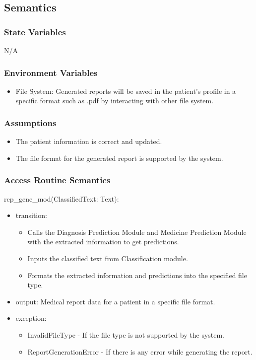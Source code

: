 \documentclass[12pt, titlepage]{article}
\begin{document}
\subsection{Semantics}

\subsubsection{State Variables}

N/A

\subsubsection{Environment Variables}

\begin{itemize}
  \item File System: Generated reports will be saved in the patient's profile in a specific format such as .pdf by interacting with other file system.
\end{itemize}

\subsubsection{Assumptions}

\begin{itemize}
  \item The patient information is correct and updated.
  \item The file format for the generated report is supported by the system.
\end{itemize}

\subsubsection{Access Routine Semantics}

\noindent rep_gene_mod(ClassifiedText: Text): 
\begin{itemize}
\item transition:
\begin{itemize}
  \item Calls the Diagnosis Prediction Module and Medicine Prediction Module with the extracted information to get predictions.
  \item Inputs the classified text from Classification module.
  \item Formats the extracted information and predictions into the specified file type.
\end{itemize}
\item output: Medical report data for a patient in a specific file format. 
\item exception: 
\begin{itemize}
  \item InvalidFileType - If the file type is not supported by the system.
  \item ReportGenerationError - If there is any error while generating the report.
\end{itemize} 
\end{itemize}
\end{document}
